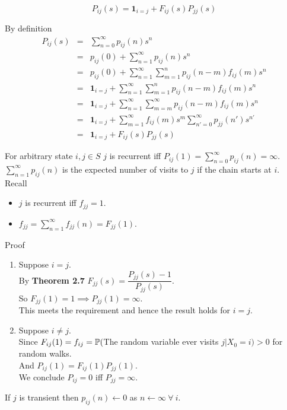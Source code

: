 \documentclass[11pt,a4paper]{article}
\begin{document}
\theorem{}
$$P_{ij}(s)=\pmb{1}_{i=j}+F_{ij}(s)P_{jj}(s)$$

\proof{}
By definition
\[\begin{array}{rcl}
P_{ij}(s)&=&\sum_{n=0}^\infty p_{ij}(n)s^n\\
&=&p_{ij}(0)+\sum_{n=1}^\infty p_{ij}(n)s^n\\
&=&p_{ij}(0)+\sum_{n=1}^\infty\sum_{m=1}^n p_{ij}(n-m)f_{ij}(m)s^n\\
&=&\pmb{1}_{i=j}+\sum_{n=1}^\infty\sum_{m=1}^n p_{ij}(n-m)f_{ij}(m)s^n\\
&=&\pmb{1}_{i=j}+\sum_{n=1}^\infty\sum_{m=m}^\infty p_{ij}(n-m)f_{ij}(m)s^n\\
&=&\pmb{1}_{i=j}+\sum_{m=1}^\infty f_{ij}(m)s^m\sum_{n'=0}^\infty p_{jj}(n')s^{n'}\\
&=&\pmb{1}_{i=j}+F_{ij}(s)P_{jj}(s)
\end{array}\]

\theorem{}
For arbitrary  state $i,j\in S$ $j$ is recurrent iff $P_{ij}(1)=\sum_{n=0}^\infty p_{ij}(n)=\infty$.\\
\nb $\sum_{n=1}^\infty p_{ij}(n)$ is the expected number of visits to $j$ if the chain starts at $i$.\\

\proof{}
Recall \begin{itemize}
	\item $j$ is recurrent iff $f_{jj}=1$.
	\item $f_{jj}=\sum_{n=1}^\infty f_{jj}(n)=F_{jj}(1)$.
\end{itemize}
Proof
\begin{enumerate}[label=\roman*)]
	\item Suppose $i=j$.\\
	By \textbf{Theorem 2.7} $F_{jj}(s)=\dfrac{P_{jj}(s)-1}{P_{jj}(s)}$.\\
	So $F_{jj}(1)=1\implies P_{jj}(1)=\infty$.\\
	This meets the requirement and hence the result holds for $i=j$.
	\item Suppose $i\neq j$.\\
	Since $F_{ij}(1)=f_{ij}=\mathbb{P}($The random variable ever visits $j|X_0=i)>0$ for random walks.\\
	And $P_{ij}(1)=F_{ij}(1)P_{jj}(1)$.\\
	We conclude $P_{ij}=0$ iff $P_{jj}=\infty$.
\end{enumerate}

\theorem{}
If $j$ is transient then $p_{ij}(n)\leftarrow0$ as $n\leftarrow\infty\ \forall\ i$.\\
\end{document}
